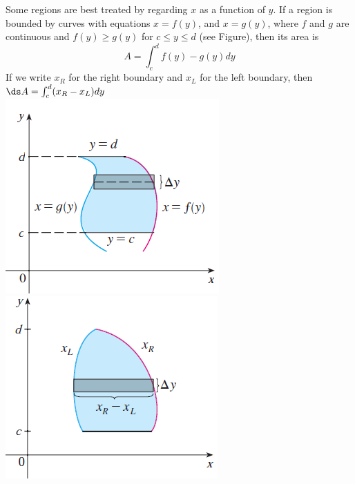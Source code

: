 \begin{frame}
Some regions are best treated by regarding $x$ as a function of $y$. If a region is bounded by curves with equations $ x=f(y) $, and $ x=g(y) $, where $ f $ and $ g $ are continuous and $ f(y)\ge g(y) $ for  $ c\le y \le  d $ (see Figure), then its area is
\[
A=\int_c^d f(y)-g(y)dy
\]
If we write $ x_R $ for the right boundary and $ x_L $ for the left boundary, then $ \ds A=\int_c^d(x_R-x_L)dy $\\


\includegraphics[width=0.4\linewidth]{../../modules/area-between-curves/pictures/H1.PNG}\;\;\;
\includegraphics[width=0.4\linewidth]{../../modules/area-between-curves/pictures/H2.PNG}\\




\end{frame}


